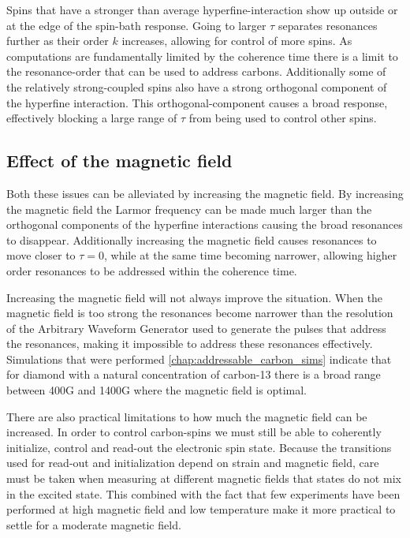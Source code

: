 Spins that have a stronger than average hyperfine-interaction show up outside or at the edge of the spin-bath response. Going to larger $\tau$ separates resonances further as their order $k$ increases, allowing for control of more spins.
 As computations are fundamentally limited by the coherence time there is a limit to the resonance-order that can be used to address carbons.
 Additionally some of the relatively strong-coupled spins also have a strong orthogonal component of the hyperfine interaction. This orthogonal-component causes a broad response, effectively blocking a large range of $\tau$ from being used to control other spins.

\subsection*{Effect of the magnetic field}
Both these issues can be alleviated by increasing the magnetic field.
By increasing the magnetic field the Larmor frequency can be made much larger than the orthogonal components of the hyperfine interactions causing the broad resonances to disappear.
Additionally increasing the magnetic field causes resonances to move closer to $\tau =0$, while at the same time becoming narrower, allowing higher order resonances to be addressed within the coherence time. %

Increasing the magnetic field will not always improve the situation. When the magnetic field is too strong the resonances become narrower than the resolution of the Arbitrary Waveform Generator used to generate the pulses that address the resonances, making it impossible to address these resonances effectively.
Simulations that were performed \cref{chap:addressable_carbon_sims} indicate that for diamond with a natural concentration of carbon-13 there is a broad range between 400G and 1400G where the magnetic field is optimal.

There are also practical limitations to how much the magnetic field can be increased. In order to control carbon-spins we must still be able to coherently initialize, control and read-out the electronic spin state. Because the transitions used for read-out and initialization depend on strain and magnetic field\citep{Hensen2011MeasurementBased}, care must be taken when measuring at different magnetic fields that states do not mix in the excited state.
This combined with the fact that few experiments have been performed at high magnetic field and low temperature make it more practical to settle for a moderate magnetic field.


